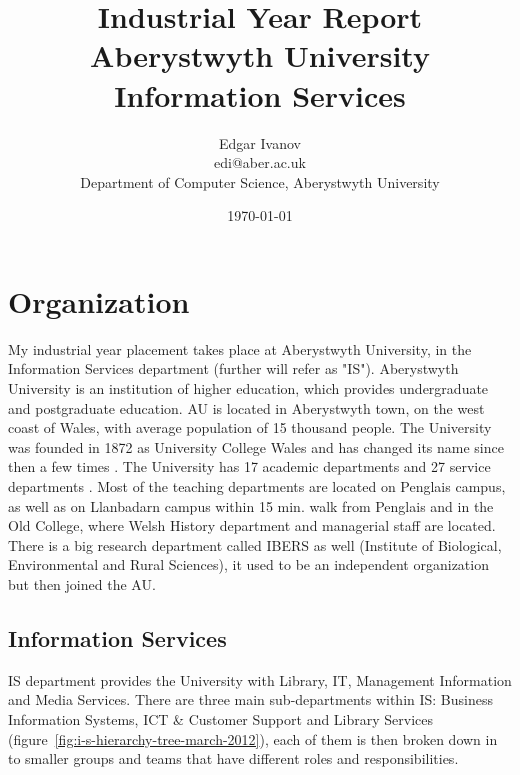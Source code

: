 \documentclass[10pt,a4paper,headinclude=true,twoside]{report}
\begin{document}
\onehalfspacing
\title{Industrial Year Report \\ Aberystwyth University Information Services}
\author{Edgar Ivanov\\ edi@aber.ac.uk \\ Department of Computer Science, Aberystwyth University}
\date{\today}

\maketitle

\newpage
\thispagestyle{empty}
\mbox{}

\tableofcontents

\chapter{Organization}
My industrial year placement takes place at Aberystwyth University, in the Information Services department (further will refer as "IS"). Aberystwyth University is an institution of higher education, which provides undergraduate and postgraduate education. AU is located in Aberystwyth town, on the west coast of Wales, with average population of 15 thousand people. The University was founded in 1872 as University College Wales and has changed its name since then a few times \cite{History}.
The University has 17 academic departments and 27 service departments \cite{Departments} \cite{Departments2}. Most of the teaching departments are located on Penglais campus, as well as on Llanbadarn campus within 15 min. walk from Penglais and in the Old College, where Welsh History department and managerial staff are located. There is a big research department called IBERS as well (Institute of Biological, Environmental and Rural Sciences), it used to be an independent organization but then joined the AU.

\section{Information Services}
IS department provides the University with Library, IT, Management Information and Media Services. There are three main sub-departments within IS: Business Information Systems, ICT \& Customer Support and Library Services (figure~\ref{fig:i-s-hierarchy-tree-march-2012}), each of them is then broken down in to smaller groups and teams that have different roles and responsibilities.
\end{document}
